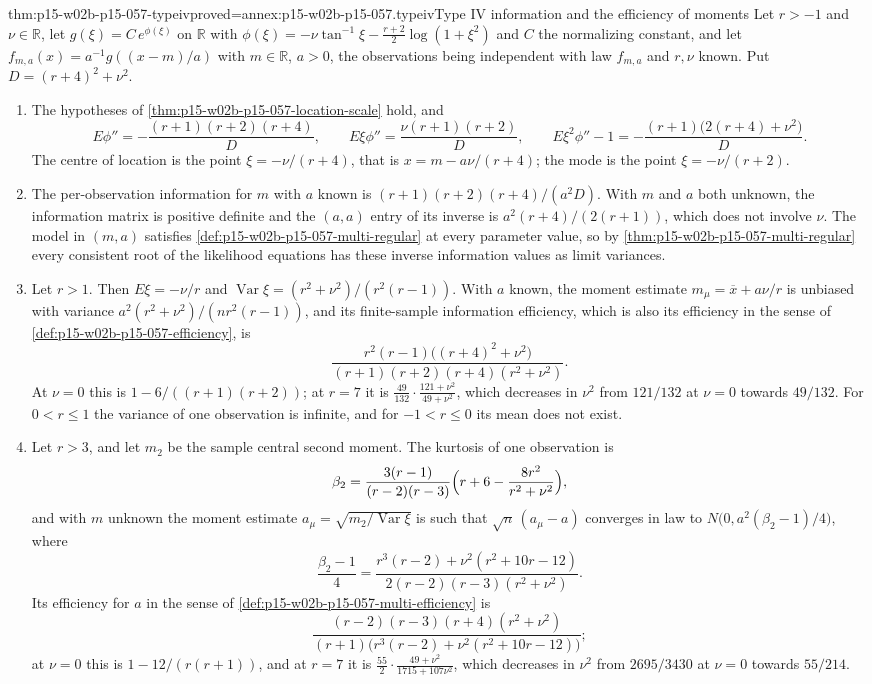 \begin{hbtheorem}{thm:p15-w02b-p15-057-typeiv}{proved=annex:p15-w02b-p15-057.typeiv}{Type IV information and the efficiency of moments}
Let \(r>-1\) and \(\nu\in\mathbb R\), let \(g(\xi)=C\,e^{\phi(\xi)}\) on
\(\mathbb R\) with
\(\phi(\xi)=-\nu\tan^{-1}\xi-\frac{r+2}2\log(1+\xi^2)\) and \(C\) the
normalizing constant, and let \(f_{m,a}(x)=a^{-1}g((x-m)/a)\) with
\(m\in\mathbb R\), \(a>0\), the observations being independent with law
\(f_{m,a}\) and \(r,\nu\) known. Put \(D=(r+4)^2+\nu^2\).
\begin{enumerate}
\item The hypotheses of \cref{thm:p15-w02b-p15-057-location-scale} hold,
 and
 \[
  E\phi''=-\frac{(r+1)(r+2)(r+4)}{D},\qquad
  E\xi\phi''=\frac{\nu(r+1)(r+2)}{D},\qquad
  E\xi^2\phi''-1=-\frac{(r+1)\bigl(2(r+4)+\nu^2\bigr)}{D}.
 \]
 The centre of location is the point \(\xi=-\nu/(r+4)\), that is
 \(x=m-a\nu/(r+4)\); the mode is the point \(\xi=-\nu/(r+2)\).
\item The per-observation information for \(m\) with \(a\) known is
 \((r+1)(r+2)(r+4)/(a^2D)\). With \(m\) and \(a\) both unknown, the
 information matrix is positive definite and the \((a,a)\) entry of its
 inverse is \(a^2(r+4)/(2(r+1))\), which does not involve \(\nu\). The
 model in \((m,a)\) satisfies \cref{def:p15-w02b-p15-057-multi-regular} at
 every parameter value, so by \cref{thm:p15-w02b-p15-057-multi-regular}
 every consistent root of the likelihood equations has these inverse
 information values as limit variances.
\item Let \(r>1\). Then \(E\xi=-\nu/r\) and
 \(\operatorname{Var}\xi=(r^2+\nu^2)/(r^2(r-1))\). With \(a\) known, the
 moment estimate \(m_\mu=\overline x+a\nu/r\) is unbiased with variance
 \(a^2(r^2+\nu^2)/(nr^2(r-1))\), and its finite-sample information
 efficiency, which is also its efficiency in the sense of
 \cref{def:p15-w02b-p15-057-efficiency}, is
 \[
  \frac{r^2(r-1)\bigl((r+4)^2+\nu^2\bigr)}{(r+1)(r+2)(r+4)(r^2+\nu^2)} .
 \]
 At \(\nu=0\) this is \(1-6/((r+1)(r+2))\); at \(r=7\) it is
 \(\frac{49}{132}\cdot\frac{121+\nu^2}{49+\nu^2}\), which decreases in
 \(\nu^2\) from \(121/132\) at \(\nu=0\) towards \(49/132\). For
 \(0<r\leq1\) the variance of one observation is infinite, and for
 \(-1<r\leq0\) its mean does not exist.
\item Let \(r>3\), and let \(m_2\) be the sample central second moment.
 The kurtosis of one observation is
 \[
  \beta_2=\frac{3(r-1)}{(r-2)(r-3)}\Bigl(r+6-\frac{8r^2}{r^2+\nu^2}\Bigr),
 \]
 and with \(m\) unknown the moment estimate
 \(a_\mu=\sqrt{m_2/\operatorname{Var}\xi}\) is such that
 \(\sqrt n\,(a_\mu-a)\) converges in law to
 \(N\bigl(0,a^2(\beta_2-1)/4\bigr)\), where
 \[
  \frac{\beta_2-1}{4}=\frac{r^3(r-2)+\nu^2(r^2+10r-12)}
  {2(r-2)(r-3)(r^2+\nu^2)} .
 \]
 Its efficiency for \(a\) in the sense of
 \cref{def:p15-w02b-p15-057-multi-efficiency} is
 \[
  \frac{(r-2)(r-3)(r+4)(r^2+\nu^2)}
  {(r+1)\bigl(r^3(r-2)+\nu^2(r^2+10r-12)\bigr)} ;
 \]
 at \(\nu=0\) this is \(1-12/(r(r+1))\), and at \(r=7\) it is
 \(\frac{55}2\cdot\frac{49+\nu^2}{1715+107\nu^2}\), which decreases in
 \(\nu^2\) from \(2695/3430\) at \(\nu=0\) towards \(55/214\).
\end{enumerate}
\end{hbtheorem}

